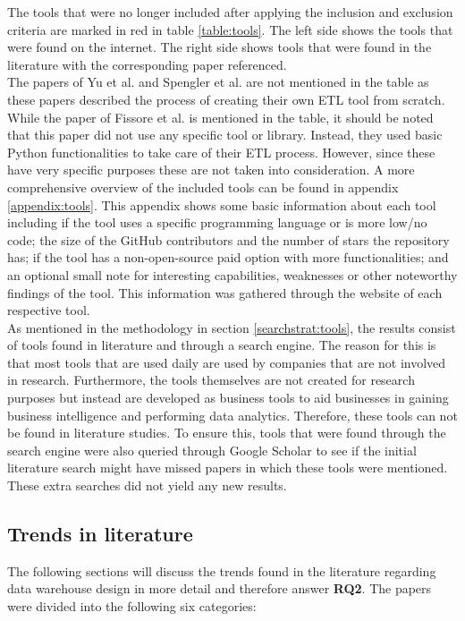 \documentclass[11pt]{article}
\begin{document}
The tools that were no longer included after applying the inclusion and exclusion criteria are marked in red in table \ref{table:tools}. The left side shows the tools that were found on the internet. The right side shows tools that were found in the literature with the corresponding paper referenced. \\

The papers of Yu et al. and Spengler et al. \cite{Yu2022, Spengler2020415} are not mentioned in the table as these papers described the process of creating their own ETL tool from scratch. While the paper of Fissore et al. is mentioned in the table, it should be noted that this paper did not use any specific tool or library. Instead, they used basic Python functionalities to take care of their ETL process. However, since these have very specific purposes these are not taken into consideration. A more comprehensive overview of the included tools can be found in appendix \ref{appendix:tools}. This appendix shows some basic information about each tool including if the tool uses a specific programming language or is more low/no code; the size of the GitHub contributors and the number of stars the repository has; if the tool has a non-open-source paid option with more functionalities; and an optional small note for interesting capabilities, weaknesses or other noteworthy findings of the tool. This information was gathered through the website of each respective tool. \\ 

As mentioned in the methodology in section \ref{searchstrat:tools}, the results consist of tools found in literature and through a search engine. The reason for this is that most tools that are used daily are used by companies that are not involved in research. Furthermore, the tools themselves are not created for research purposes but instead are developed as business tools to aid businesses in gaining business intelligence and performing data analytics. Therefore, these tools can not be found in literature studies. To ensure this, tools that were found through the search engine were also queried through Google Scholar to see if the initial literature search might have missed papers in which these tools were mentioned. These extra searches did not yield any new results. 


\subsection{Trends in literature}
\label{results:trends}
The following sections will discuss the trends found in the literature regarding data warehouse design in more detail and therefore answer \textbf{RQ2}. The papers were divided into the following six categories:
\end{document}
